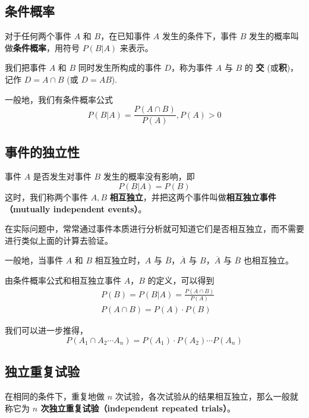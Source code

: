 

\subsection{条件概率}
对于任何两个事件 $A$ 和 $B$，在已知事件 $A$ 发生的条件下，事件 $B$ 发生的概率叫做\textbf{条件概率}，用符号 $P(B|A)$ 来表示。

我们把事件 $A$ 和 $B$ 同时发生所构成的事件 $D$，称为事件 $A$ 与 $B$ 的 \textbf{交} (或\textbf{积})，记作 $D = A \cap B$ (或 $D = AB$).

一般地，我们有条件概率公式
\begin{equation}
P(B|A) = \frac{P(A \cap B)}{P(A)},P(A)>0
\end{equation}

\subsection{事件的独立性}
事件 $A$ 是否发生对事件 $B$ 发生的概率没有影响，即
\begin{equation}
P(B|A) = P(B)
\end{equation}
这时，我们称两个事件 $A,B$ \textbf{相互独立}，并把这两个事件叫做\textbf{相互独立事件（mutually independent events）}。

在实际问题中，常常通过事件本质进行分析就可知道它们是否相互独立，而不需要进行类似上面的计算去验证。

一般地，当事件 $A$ 和 $B$ 相互独立时，$A$ 与 $\overline{B}$，$\overline{A}$ 与 $B$，$\overline{A}$ 与 $\overline{B}$ 也相互独立。

由条件概率公式和相互独立事件 $A$，$B$ 的定义，可以得到
\begin{equation}
\begin{aligned}
&P(B) = P(B|A) = \frac{P(A \cap B)}{P(A)} \\
&P(A\cap B) = P(A) \cdot P(B)
\end{aligned}
\end{equation}

我们可以进一步推得，
\begin{equation}
P(A_1\cap A_2 \cdots A_n) = P(A_1) \cdot P(A_2) \cdots P(A_n)
\end{equation}

\subsection{独立重复试验}
在相同的条件下，重复地做 $n$ 次试验，各次试验从的结果相互独立，那么一般就称它为 \textbf{ $n$ 次独立重复试验（independent repeated trials）}。

